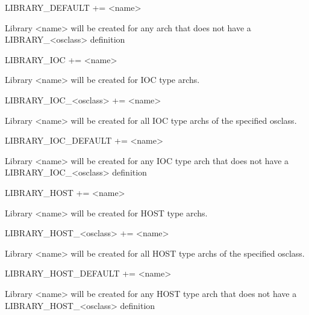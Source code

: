 \begin{description}\item LIBRARY\_DEFAULT += \textless{}name\textgreater{}

\end{description}Library \textless{}name\textgreater{} will be created for any arch that does not have a LIBRARY\_\textless{}osclass\textgreater{} definition

\begin{description}\item {}LIBRARY\_IOC += \textless{}name\textgreater{}

\end{description}Library \textless{}name\textgreater{} will be created for IOC type archs.

\begin{description}\item LIBRARY\_IOC\_\textless{}osclass\textgreater{} += \textless{}name\textgreater{}

\end{description}Library \textless{}name\textgreater{} will be created for all IOC type archs of the specified osclass.

\begin{description}\item LIBRARY\_IOC\_DEFAULT += \textless{}name\textgreater{}

\end{description}Library \textless{}name\textgreater{} will be created for any IOC type arch that does not have a LIBRARY\_IOC\_\textless{}osclass\textgreater{} 
definition

\begin{description}\item {}LIBRARY\_HOST += \textless{}name\textgreater{}

\end{description}Library \textless{}name\textgreater{} will be created for HOST type archs.

\begin{description}\item LIBRARY\_HOST\_\textless{}osclass\textgreater{} += \textless{}name\textgreater{}

\end{description}Library \textless{}name\textgreater{} will be created for all HOST type archs of the specified osclass.

\begin{description}\item LIBRARY\_HOST\_DEFAULT += \textless{}name\textgreater{}

\end{description}Library \textless{}name\textgreater{} will be created for any HOST type arch that does not have a LIBRARY\_HOST\_\textless{}osclass\textgreater{} 
definition

